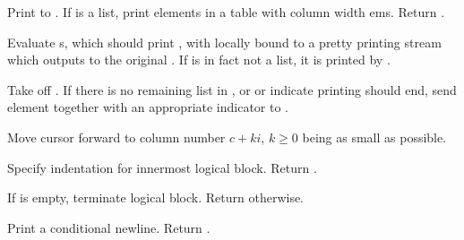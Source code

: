 \begin{LIST}{1cm}
  {
  Print  to . If  is a list, print
  elements in a table with column width  ems.  Return \retval{\NIL}.
  }

  {
  Evaluate s, which should print , with
   locally bound to a pretty 
  printing stream which outputs to the original . If
   is in fact not a list, it is printed by .
  }

  \begin{LIST}{.5cm}

    {
    Take  off . If there is no remaining
    list in , or  or  indicate
    printing should end, send element together with an appropriate
    indicator to . 
  }

    {
    Move cursor forward to column number $c + ki$, $k \geq 0$ being as small
    as possible.
  }

    {
    Specify indentation for innermost logical block. Return \retval{\NIL}.
  }

    {
    If  is empty, terminate logical block. Return
    \retval{\NIL} otherwise.
  }
    
  \end{LIST}

  {
  Print a conditional newline. Return \retval{\NIL}.
  }


\end{LIST}
